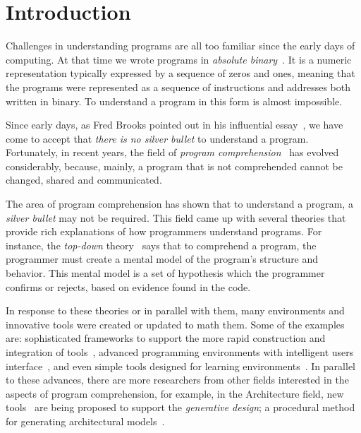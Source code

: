 
% 
% 

\section{Introduction}

Challenges in understanding programs are all too familiar since the early days of computing. At that time we wrote programs in \textit{absolute binary}~\cite{hamming2003art}. It is a numeric representation typically expressed by a sequence of zeros and ones, meaning that the programs were represented as a sequence of instructions and addresses both written in binary. To understand a program in this form is almost impossible.

Since early days, as Fred Brooks pointed out in his influential essay~\cite{bullet1987essence}, we have come to accept that \textit{there is no silver bullet} to understand a program. Fortunately, in recent years, the field of \textit{program comprehension}~\cite{rugaber1995program} has evolved considerably, because, mainly, a program that is not comprehended cannot be changed, shared and communicated.

The area of program comprehension has shown that to understand a program, a \textit{silver bullet} may not be required. This field came up with several theories that provide rich explanations of how programmers understand programs. For instance, the \textit{top-down} theory~\cite{brooks1977towards} says that to comprehend a program, the programmer must create a mental model of the program's structure and behavior. This mental model is a set of hypothesis which the programmer confirms or rejects, based on evidence found in the code.

In response to these theories or in parallel with them, many environments and innovative tools were created or updated to math them. Some of the examples are: sophisticated frameworks to support the more rapid construction and integration of tools~\cite{DesRivieres2004}, advanced programming environments with intelligent users interface~\cite{carlson2005eclipse,boudreau2002netbeans,intellij2001intellij,guckenheimer2006software}, and even simple tools designed for learning environments~\cite{papert1980mindstorms,Kay1993,Reas2006,findler2002drscheme,GuoSIGCSE2013,mcdirmid2013usable}. In parallel to these advances, there are more researchers from other fields interested in the aspects of program comprehension, for example, in the Architecture field, new tools~\cite{aish2012designscript,lopes2011portable} are being proposed to support the \textit{generative design}; a procedural method for generating architectural models~\cite{mccormack2004generative}.

